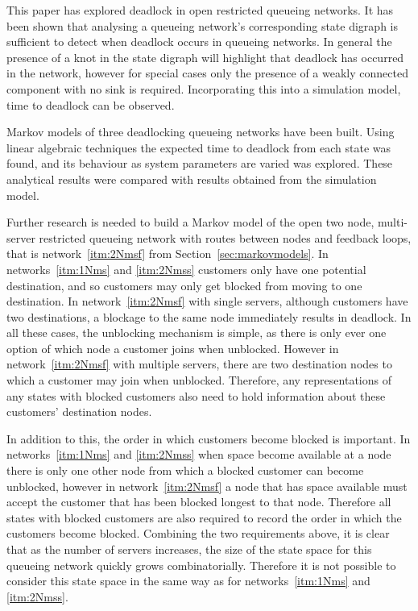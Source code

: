 \documentclass{article}
\numberwithin{equation}{section}
\begin{document}
This paper has explored deadlock in open restricted queueing networks.
It has been shown that analysing a queueing network's corresponding state
digraph is sufficient to detect when deadlock occurs in queueing networks.
In general the presence of a knot in the state digraph will highlight that
deadlock has occurred in the network, however for special cases only the
presence of a weakly connected component with no sink is required.
Incorporating this into a simulation model, time to deadlock can be observed.

Markov models of three deadlocking queueing networks have been built.
Using linear algebraic techniques the expected time to deadlock from each
state was found, and its behaviour as system parameters are varied was explored.
These analytical results were compared with results obtained from the
simulation model.

Further research is needed to build a Markov model of the open two node,
multi-server restricted queueing network with routes between nodes and
feedback loops, that is network~\ref{itm:2Nmsf} from Section~\ref{sec:markovmodels}.
In networks~\ref{itm:1Nms} and \ref{itm:2Nmss} customers only have one
potential destination, and so customers may only get blocked from moving to
one destination.
In network~\ref{itm:2Nmsf} with single servers, although customers have two
destinations, a blockage to the same node immediately results in deadlock.
In all these cases, the unblocking mechanism is simple, as there is only ever
one option of which node a customer joins when unblocked.
However in network~\ref{itm:2Nmsf} with multiple servers, there are two
destination nodes to which a customer may join when unblocked.
Therefore, any representations of any states with blocked customers also need
to hold information about these customers' destination nodes.

In addition to this, the order in which customers become blocked is important.
In networks~\ref{itm:1Nms} and \ref{itm:2Nmss} when space become available at
a node there is only one other node from which a blocked customer can become
unblocked, however in network~\ref{itm:2Nmsf} a node that has space available
must accept the customer that has been blocked longest to that node.
Therefore all states with blocked customers are also required to record the
order in which the customers become blocked.
Combining the two requirements above, it is clear that as the number of
servers increases, the size of the state space for this queueing network
quickly grows combinatorially.
Therefore it is not possible to consider this state space in the same way as
for networks~\ref{itm:1Nms} and \ref{itm:2Nmss}.
\end{document}
